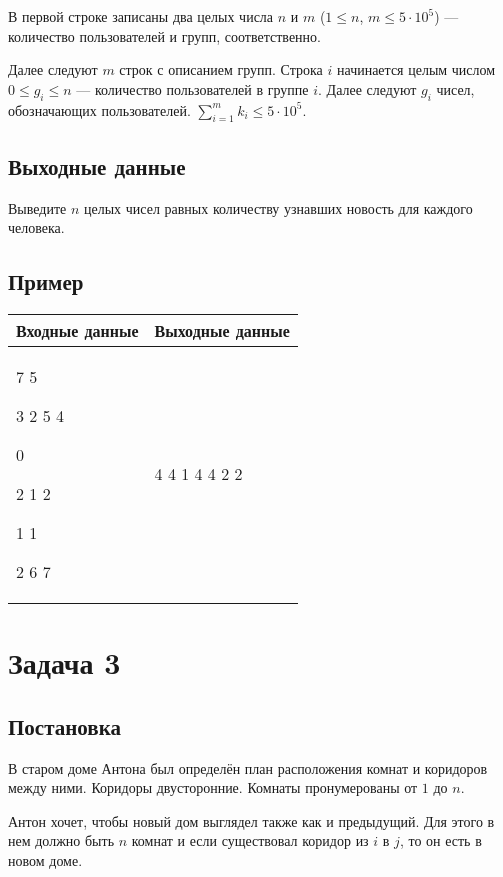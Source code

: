 \documentclass{extarticle}
\begin{document}
В первой строке записаны два целых числа \(n\) и \(m\)
(\(1 \leq n\), \(m \leq 5 \cdot 10^{5}\)) — количество пользователей и групп, соответственно.

Далее следуют \(m\) строк с описанием групп.
Строка \(i\) начинается целым числом \(0 \leq g_{i} \leq n\) — количество пользователей в
группе \(i\).
Далее следуют \(g_{i}\) чисел, обозначающих пользователей.
\(\sum_{i=1}^{m} k_{i} \leq 5 \cdot 10^{5}\).

\subsection*{Выходные данные}
\label{sec:org85360ac}

Выведите \(n\) целых чисел
равных количеству узнавших новость для каждого человека.

\subsection*{Пример}
\label{sec:orgaf8000e}

\begin{table}[H]
\begin{center}
\begin{tabular}{|m{4cm}|m{4cm}|}
\hline
Входные данные & Выходные данные \\ \hline
7 5

3 2 5 4

0

2 1 2

1 1

2 6 7
&
4 4 1 4 4 2 2
\\ \hline
\end{tabular}
\end{center}
\end{table}

\pagebreak
\section*{Задача 3}
\label{sec:org9a2cd05}
\subsection*{Постановка}
\label{sec:org34d1650}

В старом доме Антона был определён план
расположения комнат и коридоров между ними.
Коридоры двусторонние.
Комнаты пронумерованы от \(1\) до \(n\).

Антон хочет, чтобы новый дом выглядел также как и предыдущий.
Для этого в нем должно быть \(n\) комнат и если существовал
коридор из \(i\) в \(j\), то он есть в новом доме.
\end{document}
